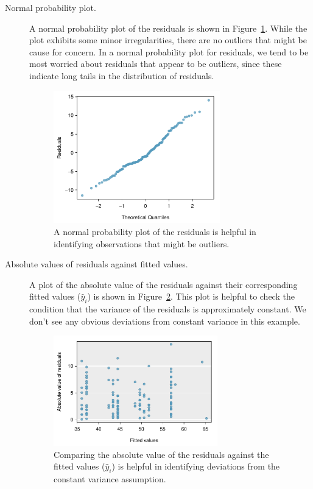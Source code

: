 \begin{description}
\item[Normal probability plot.] A normal probability plot of the residuals is shown in Figure~\ref{mkDiagnosticNormalQuantilePlot}. While the plot exhibits some minor irregularities, there are no outliers that might be cause for concern. In a normal probability plot for residuals, we tend to be most worried about residuals that appear to be outliers, since these indicate long tails in the distribution of residuals.

\begin{figure}[h]
\centering
\includegraphics[width=0.71\textwidth]{ch_regr_mult_and_log/figures/marioKartDiagnostics/mkDiagnosticNormalQuantilePlot}
\caption{A normal probability plot of the residuals is helpful in identifying observations that might be outliers.}
\label{mkDiagnosticNormalQuantilePlot}
\end{figure}

\item[Absolute values of residuals against fitted values.] A plot of the absolute value of the residuals against their corresponding fitted values ($\hat{y}_i$) is shown in Figure~\ref{mkDiagnosticEvsAbsF}. This plot is helpful to check the condition that the variance of the residuals is approximately constant. We don't see any obvious deviations from constant variance in this example.

\begin{figure}
\centering
\includegraphics[width=0.7\textwidth]{ch_regr_mult_and_log/figures/marioKartDiagnostics/mkDiagnosticEvsAbsF}
\caption{Comparing the absolute value of the residuals against the fitted values ($\hat{y}_i$) is helpful in identifying deviations from the constant variance assumption.}
\label{mkDiagnosticEvsAbsF}
\end{figure}


\end{description}
